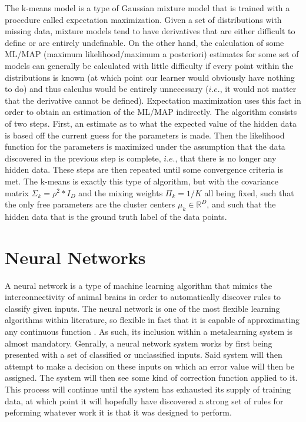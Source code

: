 The k-means model is a type of Gaussian mixture model that is trained with a procedure
called expectation maximization. Given a set of distributions with missing data, mixture models tend to have derivatives that are either difficult to define
or are entirely undefinable. On the other hand, the calculation of some ML/MAP (maximum likelihood/maximum a posteriori)
estimates for some set of models can generally be calculated with little
difficulty if every point within the distributions is known (at which point our
learner would obviously have nothing to do) and thus calculus would be entirely
unnecessary ($i.e.$, it would not matter that the derivative cannot be defined).
Expectation maximization uses this fact in order to obtain an estimation of the
ML/MAP indirectly. The algorithm consists of two steps. First, an estimate as
to what the expected value of the hidden data is based off the current guess for the
parameters is made. Then the likelihood function for the parameters is maximized under
the assumption that the data discovered in the previous step is complete, $i.e.$, that there
is no longer any hidden data. These steps are then repeated until some convergence criteria
is met. The k-means is exactly this type of algorithm, but with the covariance matrix
$\Sigma_{k} = \rho^{2}*I_{D}$ and the mixing weights $\Pi_{k} = 1/K$ all being fixed, such
that the only free parameters are the cluster centers $\mu_{k} \in \mathbb{R}^{D}$,
and such that the hidden data that is the ground truth label of the data points.
\section{Neural Networks}
A neural network is a type of machine learning algorithm that mimics
the interconnectivity of animal brains in order to automatically
discover rules to classify given inputs. The neural network is one of the most
flexible learning algorithms within literature, so flexible in fact that it is
capable of approximating any continuous function \cite{Hornik}. As such, its
inclusion within a metalearning system is almost mandatory.  Genrally,
a neural network system works by first being presented with a set of classified or
unclassified inputs. Said system will then attempt to
make a decision on these inputs on which an error value will then be
assigned. The system will then see some kind of correction function
applied to it. This process will continue until the system has
exhausted its supply of training data, at which point it will
hopefully have discovered a strong set of rules for peforming whatever
work it is that it was designed to perform.

